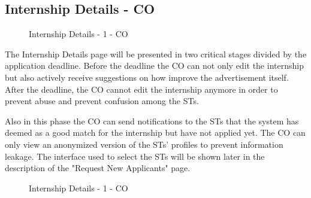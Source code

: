 \subsection{Internship Details - CO}
\label{subsec:internship-details-co}%

\begin{figure}[H]
    \centering
    \caption{Internship Details - 1 - CO}
    \label{fig:internship-creation-2-co}
\end{figure}

\par The Internship Details page will be presented in two critical stages divided by the application deadline. Before
the deadline the CO can not only edit the internship but also actively receive suggestions on how improve the
advertisement itself. After the deadline, the CO cannot edit the internship anymore in order to prevent abuse and
prevent confusion among the STs.

\par Also in this phase the CO can send notifications to the STs that the system has deemed as a good match for the
internship but have not applied yet. The CO can only view an anonymized version of the STs' profiles to prevent
information leakage. The interface used to select the STs will be shown later in the description of the "Request New
Applicants" page.

\begin{figure}[H]
    \centering
    \caption{Internship Details - 1 - CO}
    \label{fig:internship-creation-2-co}
\end{figure}

